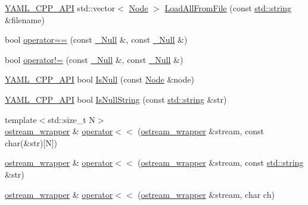 \begin{DoxyCompactItemize}
\item 
\mbox{\hyperlink{dll_8h_a70903db05b58f40db9aa4f966658fa65}{Y\+A\+M\+L\+\_\+\+C\+P\+P\+\_\+\+A\+PI}} std\+::vector$<$ \mbox{\hyperlink{class_y_a_m_l_1_1_node}{Node}} $>$ \mbox{\hyperlink{namespace_y_a_m_l_a47a9d2cd6e7dd7aa60e1dabdf1b71a1a}{Load\+All\+From\+File}} (const \mbox{\hyperlink{glad_8h_ac83513893df92266f79a515488701770}{std\+::string}} \&filename)
\item 
bool \mbox{\hyperlink{namespace_y_a_m_l_a8e7a965ead80d615dd7adcc4480cf264}{operator==}} (const \mbox{\hyperlink{struct_y_a_m_l_1_1___null}{\+\_\+\+Null}} \&, const \mbox{\hyperlink{struct_y_a_m_l_1_1___null}{\+\_\+\+Null}} \&)
\item 
bool \mbox{\hyperlink{namespace_y_a_m_l_ab100492e1626799051ab079b5a599874}{operator!=}} (const \mbox{\hyperlink{struct_y_a_m_l_1_1___null}{\+\_\+\+Null}} \&, const \mbox{\hyperlink{struct_y_a_m_l_1_1___null}{\+\_\+\+Null}} \&)
\item 
\mbox{\hyperlink{dll_8h_a70903db05b58f40db9aa4f966658fa65}{Y\+A\+M\+L\+\_\+\+C\+P\+P\+\_\+\+A\+PI}} bool \mbox{\hyperlink{namespace_y_a_m_l_a34cddbd9ea010c4144084854dc1870ad}{Is\+Null}} (const \mbox{\hyperlink{class_y_a_m_l_1_1_node}{Node}} \&node)
\item 
\mbox{\hyperlink{dll_8h_a70903db05b58f40db9aa4f966658fa65}{Y\+A\+M\+L\+\_\+\+C\+P\+P\+\_\+\+A\+PI}} bool \mbox{\hyperlink{namespace_y_a_m_l_a46e9fa24850a3d1fec3b2035c47d22f3}{Is\+Null\+String}} (const \mbox{\hyperlink{glad_8h_ac83513893df92266f79a515488701770}{std\+::string}} \&str)
\item 
{\footnotesize template$<$std\+::size\+\_\+t N$>$ }\\\mbox{\hyperlink{class_y_a_m_l_1_1ostream__wrapper}{ostream\+\_\+wrapper}} \& \mbox{\hyperlink{namespace_y_a_m_l_a1806970a1c87cb0e184a6901d234a453}{operator$<$$<$}} (\mbox{\hyperlink{class_y_a_m_l_1_1ostream__wrapper}{ostream\+\_\+wrapper}} \&stream, const char(\&str)\mbox{[}N\mbox{]})
\item 
\mbox{\hyperlink{class_y_a_m_l_1_1ostream__wrapper}{ostream\+\_\+wrapper}} \& \mbox{\hyperlink{namespace_y_a_m_l_af403c1cea3db6d0f608514ff4fa903f3}{operator$<$$<$}} (\mbox{\hyperlink{class_y_a_m_l_1_1ostream__wrapper}{ostream\+\_\+wrapper}} \&stream, const \mbox{\hyperlink{glad_8h_ac83513893df92266f79a515488701770}{std\+::string}} \&str)
\item 
\mbox{\hyperlink{class_y_a_m_l_1_1ostream__wrapper}{ostream\+\_\+wrapper}} \& \mbox{\hyperlink{namespace_y_a_m_l_a0845c5f5426c45ca6a9aab75ee668b11}{operator$<$$<$}} (\mbox{\hyperlink{class_y_a_m_l_1_1ostream__wrapper}{ostream\+\_\+wrapper}} \&stream, char ch)

\end{DoxyCompactItemize}
